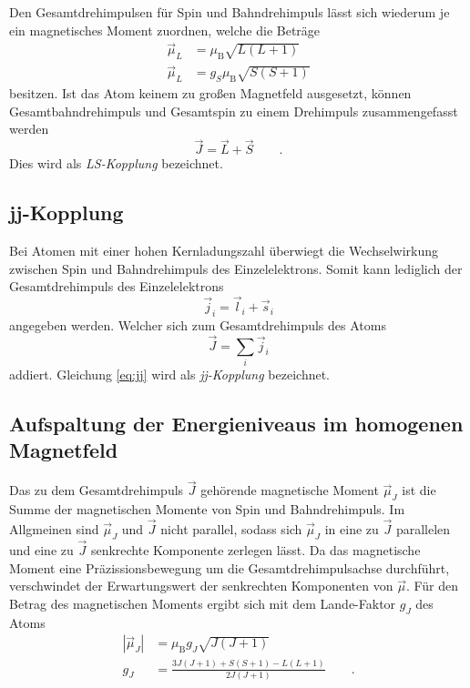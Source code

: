 Den Gesamtdrehimpulsen für Spin und Bahndrehimpuls lässt sich wiederum je ein magnetisches Moment zuordnen, welche die Beträge
\begin{align}
\vec{\mu}_L &= \mu_{\text{B}}\sqrt{L(L+1)} \\
\vec{\mu}_L &= g_S \mu_{\text{B}}\sqrt{S(S+1)}
\end{align}
besitzen. Ist das Atom keinem zu großen Magnetfeld ausgesetzt, können Gesamtbahndrehimpuls und Gesamtspin zu einem Drehimpuls zusammengefasst werden
\begin{equation}
\vec{J}=\vec{L}+\vec{S} \qquad .
\end{equation}
Dies wird als \textit{LS-Kopplung} bezeichnet.

\subsection*{jj-Kopplung}
Bei Atomen mit einer hohen Kernladungszahl überwiegt die Wechselwirkung zwischen Spin und Bahndrehimpuls des Einzelelektrons. Somit kann lediglich der Gesamtdrehimpuls des Einzelelektrons
\begin{equation}
\vec{j}_i = \vec{l}_i + \vec{s}_i
\end{equation}
angegeben werden. Welcher sich zum Gesamtdrehimpuls des Atoms 
\begin{equation}
\vec{J} = \sum_i \vec{j}_i \label{eq:jj}
\end{equation}
addiert. Gleichung \eqref{eq:jj} wird als \textit{jj-Kopplung} bezeichnet.

\subsection{Aufspaltung der Energieniveaus im homogenen Magnetfeld}
Das zu dem Gesamtdrehimpuls $\vec{J}$ gehörende magnetische Moment $\vec{\mu}_J$ ist die Summe der magnetischen Momente von Spin und Bahndrehimpuls. Im Allgmeinen sind $\vec{\mu}_J$ und $\vec{J}$ nicht parallel, sodass sich $\vec{\mu}_J$ in eine zu $\vec{J}$ parallelen
und eine zu $\vec{J}$ senkrechte Komponente zerlegen lässt. Da das magnetische Moment eine Präzissionsbewegung um die Gesamtdrehimpulsachse durchführt, verschwindet der Erwartungswert der senkrechten Komponenten von $\vec{\mu}$.
Für den Betrag des magnetischen Moments ergibt sich mit dem Lande-Faktor $g_J$ des Atoms
\begin{align}
|\vec{\mu}_J| &= \mu_\text{B}g_J\sqrt{J(J+1)} \\
g_J &= \frac{3J(J+1)+S(S+1)-L(L+1)}{2J(J+1)} \qquad \label{eq:lande} .
\end{align}

